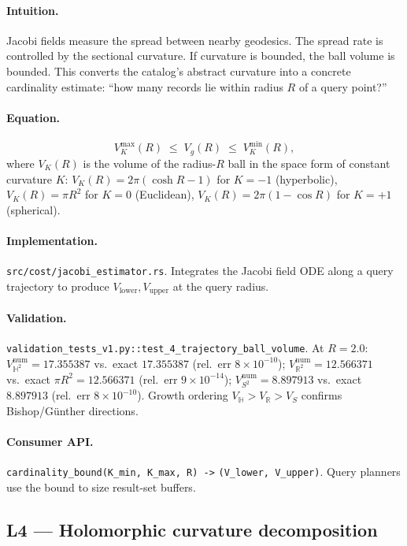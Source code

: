 \documentclass[11pt,letterpaper]{article}
\begin{document}
\paragraph{Intuition.}
Jacobi fields measure the spread between nearby geodesics. The
spread rate is controlled by the sectional curvature. If curvature
is bounded, the ball volume is bounded. This converts the catalog's
abstract curvature into a concrete cardinality estimate: ``how many
records lie within radius $R$ of a query point?''

\paragraph{Equation.}
\[
V_K^{\max}(R) \;\leq\; V_g(R) \;\leq\; V_K^{\min}(R),
\]
where $V_K(R)$ is the volume of the radius-$R$ ball in the space
form of constant curvature $K$:
$V_K(R) = 2\pi (\cosh R - 1)$ for $K = -1$ (hyperbolic),
$V_K(R) = \pi R^2$ for $K = 0$ (Euclidean),
$V_K(R) = 2\pi (1 - \cos R)$ for $K = +1$ (spherical).

\paragraph{Implementation.}
\texttt{src/cost/jacobi\_estimator.rs}. Integrates
the Jacobi field ODE along a query trajectory to produce
$V_{\text{lower}}, V_{\text{upper}}$ at the query radius.

\paragraph{Validation.}
\texttt{validation\_tests\_v1.py::test\_4\_trajectory\_ball\_volume}.
At $R = 2.0$:
$V_{\mathbb{H}^2}^{\text{num}} = 17.355387$ vs.\ exact $17.355387$
(rel.\ err $8 \times 10^{-10}$); $V_{\mathbb{R}^2}^{\text{num}} =
12.566371$ vs.\ exact $\pi R^2 = 12.566371$ (rel.\ err $9 \times
10^{-14}$); $V_{S^2}^{\text{num}} = 8.897913$ vs.\ exact $8.897913$
(rel.\ err $8 \times 10^{-10}$). Growth ordering
$V_{\mathbb{H}} > V_{\mathbb{R}} > V_S$ confirms Bishop/G\"unther
directions.

\paragraph{Consumer API.}
\verb|cardinality_bound(K_min, K_max, R) ->|
\verb|(V_lower, V_upper)|. Query planners use the bound to size
result-set buffers.


\subsection{L4 --- Holomorphic curvature decomposition}
\end{document}
